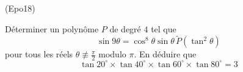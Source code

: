 \begin{tiny}(Epo18)\end{tiny} Déterminer un polynôme $P$ de degré $4$ tel que
\begin{displaymath}
 \sin 9\theta = \cos^8 \theta \sin\theta \,\widetilde{P}(\tan^2 \theta)
\end{displaymath}
pour tous les réels $\theta \not \equiv\frac{\pi}{2}$ modulo $\pi$.
En déduire que
\begin{displaymath}
 \tan 20^\circ \times \tan 40^\circ \times \tan 60^\circ \times  \tan 80^\circ = 3
\end{displaymath}
